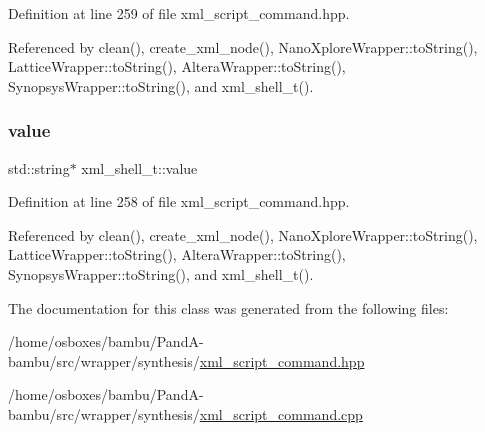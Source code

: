 Definition at line 259 of file xml\+\_\+script\+\_\+command.\+hpp.



Referenced by clean(), create\+\_\+xml\+\_\+node(), Nano\+Xplore\+Wrapper\+::to\+String(), Lattice\+Wrapper\+::to\+String(), Altera\+Wrapper\+::to\+String(), Synopsys\+Wrapper\+::to\+String(), and xml\+\_\+shell\+\_\+t().

\mbox{\label{classxml__shell__t_ad37f4489480205e4410812601449916f}} 
\subsubsection{\texorpdfstring{value}{value}}
{\footnotesize\ttfamily std\+::string$\ast$ xml\+\_\+shell\+\_\+t\+::value}



Definition at line 258 of file xml\+\_\+script\+\_\+command.\+hpp.



Referenced by clean(), create\+\_\+xml\+\_\+node(), Nano\+Xplore\+Wrapper\+::to\+String(), Lattice\+Wrapper\+::to\+String(), Altera\+Wrapper\+::to\+String(), Synopsys\+Wrapper\+::to\+String(), and xml\+\_\+shell\+\_\+t().



The documentation for this class was generated from the following files\+:\begin{DoxyCompactItemize}
\item 
/home/osboxes/bambu/\+Pand\+A-\/bambu/src/wrapper/synthesis/\hyperlink{xml__script__command_8hpp}{xml\+\_\+script\+\_\+command.\+hpp}\item 
/home/osboxes/bambu/\+Pand\+A-\/bambu/src/wrapper/synthesis/\hyperlink{xml__script__command_8cpp}{xml\+\_\+script\+\_\+command.\+cpp}\end{DoxyCompactItemize}
